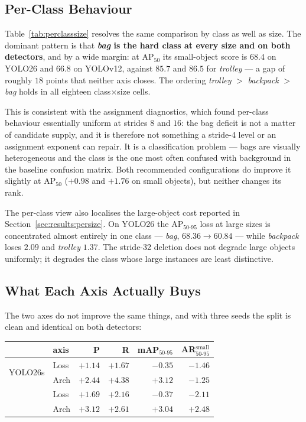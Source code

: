\documentclass[10pt,twocolumn,a4paper]{article}
\begin{document}
\subsection{Per-Class Behaviour}
\label{sec:results:perclass}




Table~\ref{tab:perclasssize} resolves the same comparison by class as well as
size. The dominant pattern is that \textbf{\emph{bag} is the hard class at every
size and on both detectors}, and by a wide margin: at AP$_{50}$ its small-object
score is $68.4$ on YOLO26 and $66.8$ on YOLOv12, against $85.7$ and $86.5$ for
\emph{trolley} --- a gap of roughly $18$ points that neither axis closes. The
ordering \emph{trolley} $>$ \emph{backpack} $>$ \emph{bag} holds in all
eighteen class$\times$size cells.

This is consistent with the assignment diagnostics, which found per-class
behaviour essentially uniform at strides $8$ and $16$: the bag deficit is not a
matter of candidate supply, and it is therefore not something a stride-4 level
or an assignment exponent can repair. It is a classification problem --- bags
are visually heterogeneous and the class is the one most often confused with
background in the baseline confusion matrix. Both recommended configurations do
improve it slightly at AP$_{50}$ ($+0.98$ and $+1.76$ on small objects), but
neither changes its rank.

The per-class view also localises the large-object cost reported in
Section~\ref{sec:results:persize}. On YOLO26 the AP$_{50\text{-}95}$ loss at
large sizes is concentrated almost entirely in one class --- \emph{bag},
$68.36 \rightarrow 60.84$ --- while \emph{backpack} loses $2.09$ and
\emph{trolley} $1.37$. The stride-32 deletion does not degrade large objects
uniformly; it degrades the class whose large instances are least distinctive.

\subsection{What Each Axis Actually Buys}

The two axes do not improve the same things, and with three seeds the split is
clean and identical on both detectors:

\begin{center}\small
\begin{tabular}{@{}llrrrr@{}}
\toprule
& axis & P & R & mAP$_{50\text{-}95}$ & AR$_{50\text{-}95}^{\text{small}}$ \\
\midrule
\multirow{2}{*}{YOLO26s}  & Loss & $+1.14$ & $+1.67$ & $\mathbf{-0.35}$ & $-1.46$ \\
                          & Arch & $+2.44$ & $+4.38$ & $\mathbf{+3.12}$ & $-1.25$ \\
\addlinespace
\multirow{2}{*}{YOLOv12s} & Loss & $+1.69$ & $+2.16$ & $\mathbf{-0.37}$ & $-2.11$ \\
                          & Arch & $+3.12$ & $+2.61$ & $\mathbf{+3.04}$ & $+2.48$ \\
\bottomrule
\end{tabular}
\end{center}
\end{document}

